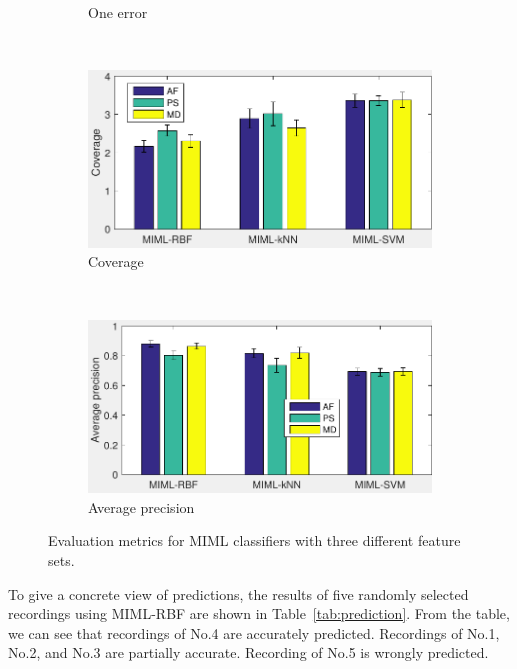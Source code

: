 \begin{figure}[htb!]
\begin{subfigure}[b]{0.45\textwidth}
                \caption{One error}               
        \end{subfigure}  
~
              \begin{subfigure}[b]{0.45\textwidth}
                \includegraphics[width=\textwidth]{image/Ch6/coverage.pdf} 
                \caption{Coverage}                
        \end{subfigure}          
   \\
              \begin{subfigure}[b]{0.45\textwidth}
                \includegraphics[width=\textwidth]{image/Ch6/avgPrecision.pdf}  
                     \caption{Average precision}         
        \end{subfigure}      
\caption[MIML classification results]{Evaluation metrics for MIML classifiers with three different feature sets.}
        \label{fig:classificationResults}
\end{figure}

To give a concrete view of predictions, the results of five randomly selected recordings using MIML-RBF are shown in Table~\ref{tab:prediction}. From the table, we can see that recordings of No.4 are accurately predicted. Recordings of No.1, No.2, and No.3 are partially accurate. Recording of No.5 is wrongly predicted.

